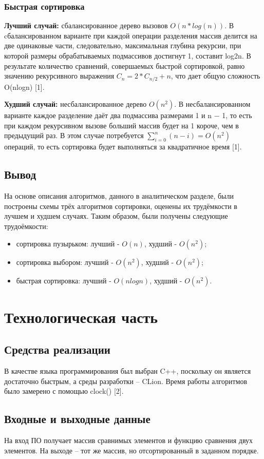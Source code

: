 \documentclass{report}
\begin{document}
\subsection{Быстрая сортировка}
\textbf{Лучший случай:} сбалансированное дерево вызовов \(O(n*log(n))\). 
В cбалансированном варианте при каждой операции разделения массив делится на две одинаковые части, следовательно, максимальная глубина рекурсии, при которой размеры обрабатываемых подмассивов достигнут 1, составит log2n. В результате количество сравнений, совершаемых быстрой сортировкой, равно значению рекурсивного выражения $C_n = 2 * C_{n / 2} + n$, что дает общую сложность O(nlogn) [1].

\textbf{Худший случай:} несбалансированное дерево $O(n^2)$.
В несбалансированном варианте каждое разделение даёт два подмассива размерами 1 и n − 1, то есть при каждом рекурсивном вызове больший массив будет на 1 короче, чем в предыдущий раз. В этом случае потребуется $\sum_{{i=0}}^{n}(n-i)=O(n^{2})$ операций, то есть сортировка будет выполняться за квадратичное время [1].
\section{Вывод}
На основе описания алгоритмов, данного в аналитическом разделе, были построены схемы трёх алгоритмов сортировки, оценены их трудёмкости в лучшем и худшем случаях. Таким образом, были получены следующие трудоёмкости:
\begin{itemize}
\item сортировка пузырьком: лучший - $O(n)$, худший - $O(n^2)$;
\item сортировка выбором: лучший - $O(n^2)$, худший - $O(n^2)$;
\item быстрая сортировка: лучший - $O(nlogn)$, худший - $O(n^2)$.
\end{itemize}
\chapter{Технологическая часть}

\section{Средства реализации}

В качестве языка программирования был выбран C++, поскольку он является достаточно быстрым, а среды разработки -- CLion. Время работы алгоритмов было замерено с помощью clock() [2].

\section{Входные и выходные данные}
На вход ПО получает массив сравнимых элементов и функцию сравнения двух элементов. На выходе -- тот же массив, но отсортированный в заданном порядке.
\end{document}
